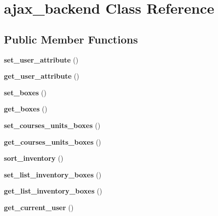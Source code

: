 \hypertarget{classajax__backend}{
\section{ajax\_\-backend Class Reference}
\label{classajax__backend}
}
\subsection*{Public Member Functions}
\begin{DoxyCompactItemize}
\item 
\hypertarget{classajax__backend_a3036eec57b185d6a4ea559506dcb8c2c}{
{\bfseries set\_\-user\_\-attribute} ()}
\label{classajax__backend_a3036eec57b185d6a4ea559506dcb8c2c}

\item 
\hypertarget{classajax__backend_a8b236632aca24c2715f94e7dc93b9dae}{
{\bfseries get\_\-user\_\-attribute} ()}
\label{classajax__backend_a8b236632aca24c2715f94e7dc93b9dae}

\item 
\hypertarget{classajax__backend_a62f35e662def158c66d559c8ed8643cc}{
{\bfseries set\_\-boxes} ()}
\label{classajax__backend_a62f35e662def158c66d559c8ed8643cc}

\item 
\hypertarget{classajax__backend_a6855c4718c5cb9cd5a861fee6c214b4e}{
{\bfseries get\_\-boxes} ()}
\label{classajax__backend_a6855c4718c5cb9cd5a861fee6c214b4e}

\item 
\hypertarget{classajax__backend_a73aef1c9f2a192789ba4a1f21f59042a}{
{\bfseries set\_\-courses\_\-units\_\-boxes} ()}
\label{classajax__backend_a73aef1c9f2a192789ba4a1f21f59042a}

\item 
\hypertarget{classajax__backend_a0a52a1cc3dd186ae0466b8ab594daa53}{
{\bfseries get\_\-courses\_\-units\_\-boxes} ()}
\label{classajax__backend_a0a52a1cc3dd186ae0466b8ab594daa53}

\item 
\hypertarget{classajax__backend_a4661762025905de892f3158683dc3d64}{
{\bfseries sort\_\-inventory} ()}
\label{classajax__backend_a4661762025905de892f3158683dc3d64}

\item 
\hypertarget{classajax__backend_a5ad90882a72f43b59181819df8f49076}{
{\bfseries set\_\-list\_\-inventory\_\-boxes} ()}
\label{classajax__backend_a5ad90882a72f43b59181819df8f49076}

\item 
\hypertarget{classajax__backend_a8b1e1798f6f88f5ce8e330a1e775606a}{
{\bfseries get\_\-list\_\-inventory\_\-boxes} ()}
\label{classajax__backend_a8b1e1798f6f88f5ce8e330a1e775606a}

\item 
\hypertarget{classajax__backend_a7d87b78615f5b58af98960d63f769021}{
{\bfseries get\_\-current\_\-user} ()}
\label{classajax__backend_a7d87b78615f5b58af98960d63f769021}

\end{DoxyCompactItemize}
